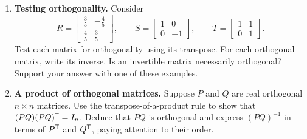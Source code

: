 \begin{enumerate}
\item \textbf{Testing orthogonality.}
Consider
\[
 R=\begin{bmatrix}\tfrac35&-\tfrac45\\[2pt]\tfrac45&\tfrac35\end{bmatrix},
 \qquad S=\begin{bmatrix}1&0\\0&-1\end{bmatrix},
 \qquad T=\begin{bmatrix}1&1\\0&1\end{bmatrix}.
\]
Test each matrix for orthogonality using its transpose. For each orthogonal
matrix, write its inverse. Is an invertible matrix necessarily orthogonal?
Support your answer with one of these examples.

\item \textbf{A product of orthogonal matrices.}
Suppose $P$ and $Q$ are real orthogonal $n\times n$ matrices. Use the
transpose-of-a-product rule to show that $(PQ)(PQ)^{\mathsf T}=I_n$.
Deduce that $PQ$ is orthogonal and express $(PQ)^{-1}$ in terms of
$P^{\mathsf T}$ and $Q^{\mathsf T}$, paying attention to their order.
\end{enumerate}

